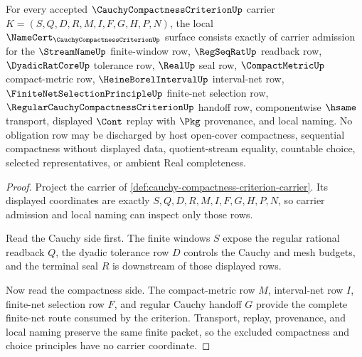 \begin{theorem}
\label{thm:cauchy-compactness-criterion-namecert-obligations}
For every accepted $\CauchyCompactnessCriterionUp$ carrier $K=(S,Q,D,R,M,I,F,G,H,P,N)$, the local $\NameCert_{\CauchyCompactnessCriterionUp}$ surface consists exactly of carrier admission for the $\StreamNameUp$ finite-window row, $\RegSeqRatUp$ readback row, $\DyadicRatCoreUp$ tolerance row, $\RealUp$ seal row, $\CompactMetricUp$ compact-metric row, $\HeineBorelIntervalUp$ interval-net row, $\FiniteNetSelectionPrincipleUp$ finite-net selection row, $\RegularCauchyCompactnessCriterionUp$ handoff row, componentwise $\hsame$ transport, displayed $\Cont$ replay with $\Pkg$ provenance, and local naming. No obligation row may be discharged by host open-cover compactness, sequential compactness without displayed data, quotient-stream equality, countable choice, selected representatives, or ambient Real completeness.
\end{theorem}
\begin{proof}
Project the carrier of \autoref{def:cauchy-compactness-criterion-carrier}. Its displayed coordinates are exactly $S,Q,D,R,M,I,F,G,H,P,N$, so carrier admission and local naming can inspect only those rows.

Read the Cauchy side first. The finite windows $S$ expose the regular rational readback $Q$, the dyadic tolerance row $D$ controls the Cauchy and mesh budgets, and the terminal seal $R$ is downstream of those displayed rows.

Now read the compactness side. The compact-metric row $M$, interval-net row $I$, finite-net selection row $F$, and regular Cauchy handoff $G$ provide the complete finite-net route consumed by the criterion. Transport, replay, provenance, and local naming preserve the same finite packet, so the excluded compactness and choice principles have no carrier coordinate.
\end{proof}

